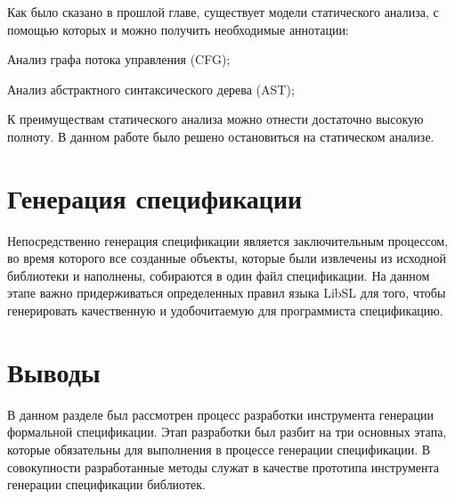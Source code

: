 Как было сказано в прошлой главе, существует модели статического анализа, с помощью которых и можно получить необходимые аннотации:
%
\begin{itemize*}
\item Анализ графа потока управления (CFG);
\item Анализ абстрактного синтаксического дерева (AST);
\end{itemize*}
%
К преимуществам статического анализа можно отнести достаточно высокую полноту.
В данном работе было решено остановиться на статическом анализе.

\section{Генерация спецификации}

Непосредственно генерация спецификации является заключительным процессом, во время которого все созданные объекты, которые были извлечены из исходной библиотеки и наполнены, собираются в один файл спецификации.
На данном этапе важно придерживаться определенных правил языка LibSL для того, чтобы генерировать качественную и удобочитаемую для программиста спецификацию.

\section{Выводы}

В данном разделе был рассмотрен процесс разработки инструмента генерации формальной спецификации. Этап разработки был разбит на три основных этапа, которые обязательны для выполнения в процессе генерации спецификации.
В совокупности разработанные методы служат в качестве прототипа инструмента генерации спецификации библиотек.
